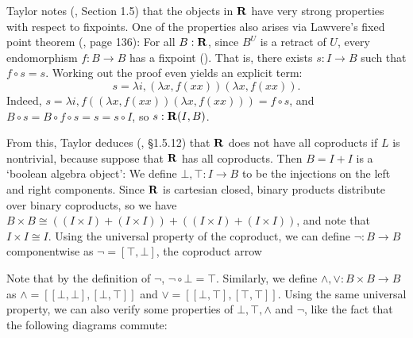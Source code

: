 Taylor notes (\autocite{taylor}, Section 1.5) that the objects in $ \mathbf{R} $ have very strong properties with respect to fixpoints. One of the properties also arises via Lawvere's fixed point theorem (\autocite{lawvere-fixpoints}, page 136): For all $ B: \mathbf{R} $, since $ B^U $ is a retract of $ U $, every endomorphism $ f: B \to B $ has a fixpoint (). That is, there exists $ s: I \to B $ such that $ f \circ s = s $. Working out the proof even yields an explicit term:
\[ s = \lambda i, (\lambda x, f (x x)) (\lambda x, f (x x)). \]
Indeed, $ s = \lambda i, f ((\lambda x, f (x x)) (\lambda x, f (x x))) = f \circ s $, and $ B \circ s = B \circ f \circ s = s = s \circ I $, so $ s : \mathbf{R}(I, B) $.

From this, Taylor deduces (\autocite{taylor}, \S 1.5.12) that $ \mathbf{R} $ does not have all coproducts if $ L $ is nontrivial, because suppose that $ \mathbf{R} $ has all coproducts. Then $ B = I + I $ is a `boolean algebra object': We define $ \bot, \top: I \to B $ to be the injections on the left and right components. Since $ \mathbf{R} $ is cartesian closed, binary products distribute over binary coproducts, so we have $ B \times B \cong ((I \times I) + (I \times I)) + ((I \times I) + (I \times I)) $, and note that $ I \times I \cong I $. Using the universal property of the coproduct, we can define $ \lnot: B \to B $ componentwise as $ \lnot = [\top, \bot] $, the coproduct arrow
\begin{center}
\end{center}
Note that by the definition of $ \lnot $, $ \lnot \circ \bot = \top $. Similarly, we define $ \land, \lor : B \times B \to B $ as $ \land = [[\bot, \bot], [\bot, \top]] $ and $ \lor = [[\bot, \top], [\top, \top]] $. Using the same universal property, we can also verify some properties of $ \bot, \top, \land $ and $ \lnot $, like the fact that the following diagrams commute:
